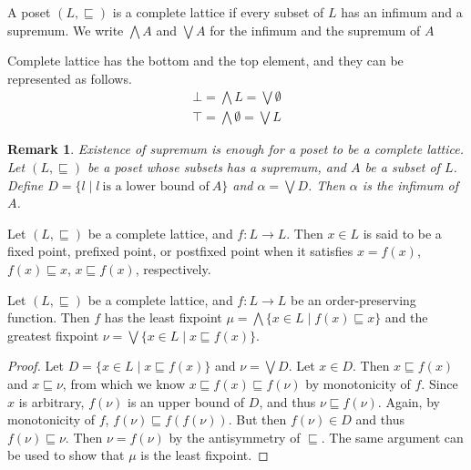 \documentclass[9pt]{beamer}
\newtheorem{remark}{Remark}
\begin{document}
\begin{frame}
  \begin{definition}
    A poset $(L, \sqsubseteq)$ is a complete lattice if
    every subset of $L$ has an infimum and a supremum.
    We write $\bigwedge A$ and $\bigvee A$ for the infimum and the supremum of $A$
  \end{definition}

  \begin{lemma}
    Complete lattice has the bottom and the top element, and they can be represented as follows.
    $$
      \begin{aligned}
        \bot = \bigwedge L         = \bigvee \emptyset \\
        \top = \bigwedge \emptyset = \bigvee L
      \end{aligned}
    $$
  \end{lemma}

  \begin{remark}
    Existence of supremum is enough for a poset to be a complete lattice.
    Let $(L, \sqsubseteq)$ be a poset whose subsets has a supremum, and $A$ be a subset of $L$.
    Define $D = \{l \mid l \ \text{is a lower bound of} \ A \}$ and $\alpha = \bigvee D$.
    Then $\alpha$ is the infimum of $A$.
  \end{remark}

  \begin{definition}
    Let $(L,\sqsubseteq)$ be a complete lattice, and $f : L \to L$.
    Then $x \in L$ is said to be a fixed point, prefixed point, or postfixed point when
    it satisfies $x = f(x)$, $f(x) \sqsubseteq x$, $x \sqsubseteq f(x)$, respectively.
  \end{definition}
\end{frame}

\begin{frame}
  \begin{lemma}
    Let $(L,\sqsubseteq)$ be a complete lattice, and $f : L \to L$ be an order-preserving function.
    Then $f$ has the least fixpoint $\mu = \bigwedge \{x \in L \mid f(x) \sqsubseteq x\}$
    and the greatest fixpoint $\nu = \bigvee \{x \in L \mid x \sqsubseteq f(x)\}$.
  \end{lemma}
  \begin{proof}
    Let $D = \{x \in L \mid x \sqsubseteq f(x)\}$ and $\nu = \bigvee D$.
    Let $x \in D$.
    Then $x \sqsubseteq f(x)$ and $x \sqsubseteq \nu$, from which we know $x \sqsubseteq f(x) \sqsubseteq f(\nu)$ by monotonicity of $f$.
    Since $x$ is arbitrary, $f(\nu)$ is an upper bound of $D$, and thus $\nu \sqsubseteq f(\nu)$.
    Again, by monotonicity of $f$, $f(\nu) \sqsubseteq f(f(\nu))$.
    But then $f(\nu) \in D$ and thus $f(\nu) \sqsubseteq \nu$.
    Then $\nu = f(\nu)$ by the antisymmetry of $\sqsubseteq$.
    The same argument can be used to show that $\mu$ is the least fixpoint.
  \end{proof}
\end{frame}
\end{document}
